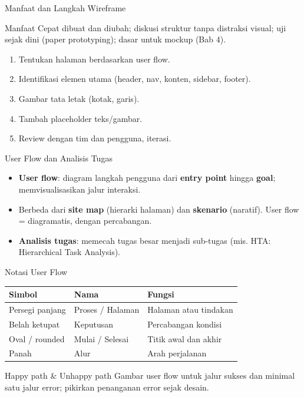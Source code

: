 \documentclass[handout]{beamer}
\begin{document}
\begin{frame}{Manfaat dan Langkah Wireframe}
	\begin{block}{Manfaat}
		Cepat dibuat dan diubah; diskusi struktur tanpa distraksi visual; uji sejak dini (paper prototyping); dasar untuk mockup (Bab 4).
	\end{block}
	\begin{enumerate}
		\item Tentukan halaman berdasarkan user flow.
		\item Identifikasi elemen utama (header, nav, konten, sidebar, footer).
		\item Gambar tata letak (kotak, garis).
		\item Tambah placeholder teks/gambar.
		\item Review dengan tim dan pengguna, iterasi.
	\end{enumerate}
\end{frame}

\begin{frame}{User Flow dan Analisis Tugas}
	\begin{itemize}
		\item \textbf{User flow}: diagram langkah pengguna dari \textbf{entry point} hingga \textbf{goal}; memvisualisasikan jalur interaksi.
		\item Berbeda dari \textbf{site map} (hierarki halaman) dan \textbf{skenario} (naratif). User flow = diagramatis, dengan percabangan.
		\item \textbf{Analisis tugas}: memecah tugas besar menjadi sub-tugas (mis. HTA: Hierarchical Task Analysis).
	\end{itemize}
\end{frame}

\begin{frame}{Notasi User Flow}
	\begin{tabular}{|l|l|l|}
		\hline
		\textbf{Simbol} & \textbf{Nama} & \textbf{Fungsi} \\
		\hline
		Persegi panjang & Proses / Halaman & Halaman atau tindakan \\
		\hline
		Belah ketupat & Keputusan & Percabangan kondisi \\
		\hline
		Oval / rounded & Mulai / Selesai & Titik awal dan akhir \\
		\hline
		Panah & Alur & Arah perjalanan \\
		\hline
	\end{tabular}
	\vspace{0.5em}
	\begin{block}{Happy path \& Unhappy path}
		Gambar user flow untuk jalur sukses dan minimal satu jalur error; pikirkan penanganan error sejak desain.
	\end{block}
\end{frame}
\end{document}
